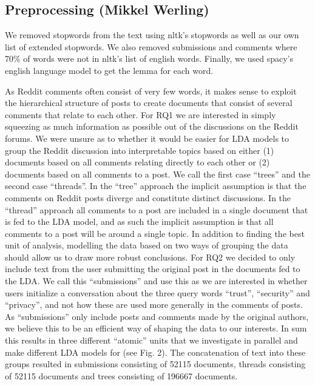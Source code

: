 \documentclass{article}
\begin{document}
    \subsection{Preprocessing (Mikkel Werling)}
    We removed stopwords from the text using nltk’s \cite{loper2002nltk} stopwords as well as our own list of extended stopwords. We also removed submissions and comments where 70\% of words were not in nltk’s list of english words. Finally, we used spacy’s \cite{spacy2} english language model to get the lemma for each word. 

As Reddit comments often consist of very few words, it makes sense to exploit the hierarchical structure of posts to create documents that consist of several comments that relate to each other. For RQ1 we are interested in simply squeezing as much information as possible out of the discussions on the Reddit forums. We were unsure as to whether it would be easier for LDA models to group the Reddit discussion into interpretable topics based on either (1) documents based on all comments relating directly to each other or (2) documents based on all comments to a post. We call the first case “trees” and the second case “threads”. In the “tree” approach the implicit assumption is that the comments on Reddit posts diverge and constitute distinct discussions. In the “thread” approach all comments to a post are included in a single document that is fed to the LDA model, and as such the implicit assumption is that all comments to a post will be around a single topic. In addition to finding the best unit of analysis, modelling the data based on two ways of grouping the data should allow us to draw more robust conclusions. 
For RQ2 we decided to only include text from the user submitting the original post in the documents fed to the LDA. We call this “submissions” and use this as we are interested in whether users initialize a conversation about the three query words “trust”, “security” and “privacy”, and not how these are used more generally in the comments of posts. As “submissions” only include posts and comments made by the original authors, we believe this to be an efficient way of shaping the data to our interests. In sum this results in three different “atomic” units that we investigate in parallel and make different LDA models for (see Fig. 2). The concatenation of text into these groups resulted in submissions consisting of 52115 documents, threads consisting of 52115 documents and trees consisting of 196667 documents. 
\end{document}
